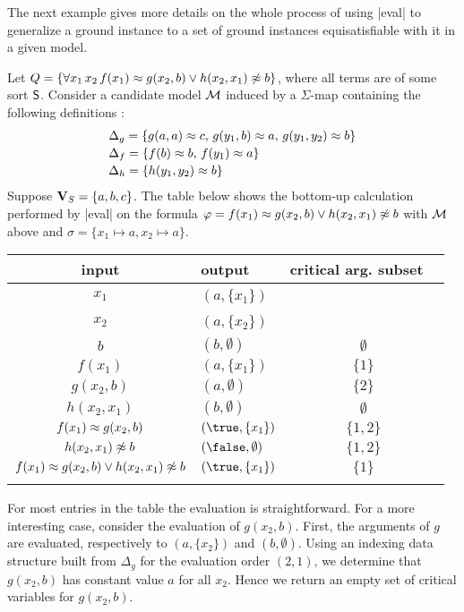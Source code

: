 \documentclass{svjour3}                     %
\begin{document}
The next example gives more details on the whole process of using |eval|
to generalize a ground instance to a set of ground instances equisatisfiable 
with it in a given model.

\begin{example}
\label{ex:qi-ge}
Let $Q = \{\forall x_1\, x_2\, f( x_1 ) \approx g( x_2, b ) \lor  h( x_2, x_1 ) \not\approx b\}$,
where all terms are of some sort $\mathsf{S}$.
Consider a candidate model $\mathcal{M}$ induced by a $\Sigma$-map containing the following definitions : 
\[
\begin{array}{l}
\Delta_g = \{ g(a,a) \approx c,\, g(y_1,b) \approx a,\, g(y_1,y_2) \approx b \}
 \\[.5ex]
\Delta_f  = \{ f(b) \approx b,\, f(y_1) \approx a \}
 \\[.5ex]
\Delta_h  = \{ h(y_1,y_2) \approx b \}
\end{array}
\]
Suppose $\mathbf{V}_{S} = \{ a, b, c \}$.
The table below shows the bottom-up calculation performed by |eval| 
on the formula $\varphi = f(x_1) \approx g(x_2,b) \lor h(x_2,x_1) \not\approx b$
with $\mathcal{M}$ above and $\sigma = \{ x_1 \mapsto a, x_2 \mapsto a \}$.

\begin{center}
\begin{tabular}{|@{\ }c@{\ }|@{\ }l@{\ }|@{\;}c|}
\hline
\bf input & \bf output & \bf critical arg. subset \ 
\\
\hline
$x_1$ & $(a, \{ x_1 \})$ & \ 
\\
$x_2$ & $(a, \{ x_2 \})$ & \ 
\\
$b$ & $(b, \emptyset)$ & $\emptyset$
\\
$f(x_1)$ & $(a, \{ x_1 \})$ & $\{ 1 \}$
\\
$g(x_2,b)$ & $(a, \emptyset)$ & $\{ 2 \}$
\\
$h(x_2,x_1)$ & $(b, \emptyset)$ & $\emptyset$
\\
$f(x_1) \approx g(x_2,b)$ & $(\true, \{ x_1 \})$ & $\{ 1, 2 \}$
\\
$h(x_2,x_1) \not\approx b$ & $(\false, \emptyset)$ & $\{ 1, 2 \}$
\\
$f(x_1) \approx g(x_2,b) \lor h(x_2,x_1) \not\approx b$ & $(\true, \{ x_1 \} )$  & $\{ 1 \}$
\\
& &
\\
\hline
\end{tabular}
\end{center}
%
For most entries in the table the evaluation is straightforward.
For a more interesting case, consider the evaluation of $g(x_2,b)$.
First, the arguments of $g$ are evaluated,
respectively to $(a, \{x_2\})$ and $(b, \emptyset)$.
Using an indexing data structure built from $\Delta_g$
for the evaluation order $(2, 1)$,
we determine that $g(x_2, b)$ has constant value $a$ for all $x_2$.
Hence we return an empty set of critical variables for $g(x_2,b)$.


\end{example}
\end{document}
